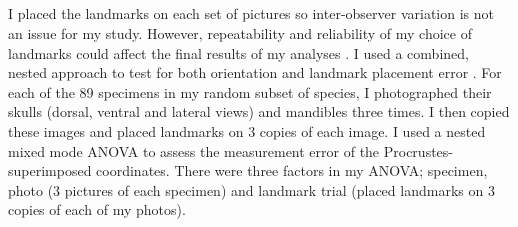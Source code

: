 \subsection{}

	I placed the landmarks on each set of pictures so inter-observer variation is not an issue for my study.  However, repeatability and reliability of my choice of landmarks could affect the final results of my analyses \citep{Arnqvist1998}.
	I used a combined, nested approach to test for both orientation and landmark placement error \citep{Arnqvist1998, Barrow2008}. For each of the 89 specimens in my random subset of species, I photographed their skulls (dorsal, ventral and lateral views) and mandibles three times. I then copied these images and placed landmarks on 3 copies of each image. I used a nested mixed mode ANOVA to assess the measurement error of the Procrustes-superimposed coordinates. There were three factors in my ANOVA; specimen, photo (3 pictures of each specimen) and landmark trial (placed landmarks on 3 copies of each of my photos).











